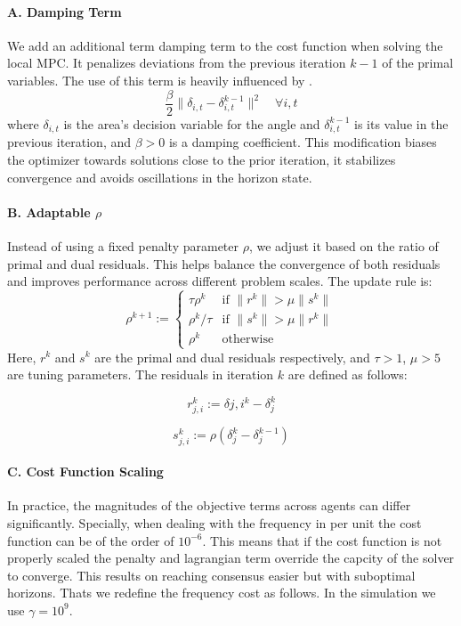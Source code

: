 \documentclass{article}
\begin{document}
\paragraph{A. Damping Term} 
We add an additional term damping term to the cost function when solving the local MPC. It penalizes deviations from the previous iteration $k-1$ of the primal variables. The use of this term is heavily influenced by \cite{ADMM:edu}.
\[
 \frac{\beta}{2} \|\delta_{i,t} - \delta_{i,t}^{k-1}\|^2 \quad \forall i,t
\]
where $\delta_{i,t}$ is the area's decision variable for the angle and  $\delta_{i,t}^{k-1}$ is its value in the previous iteration, and \( \beta > 0 \) is a damping coefficient. This modification biases the optimizer towards solutions close to the prior iteration, it stabilizes convergence and avoids oscillations in the horizon state.

\paragraph{B. Adaptable \(\rho\)} 


Instead of using a fixed penalty parameter \( \rho \), we adjust it based on the ratio of primal and dual residuals. This helps balance the convergence of both residuals and improves performance across different problem scales\cite{ADMM:boyd}. The update rule is:
\[
\rho^{k+1} := 
\begin{cases}
\tau \rho^k & \text{if } \|r^k\| > \mu \|s^k\| \\
\rho^k / \tau & \text{if } \|s^k\| > \mu \|r^k\| \\
\rho^k & \text{otherwise}
\end{cases}
\]
Here, \( r^k \) and \( s^k \) are the primal and dual residuals respectively, and \( \tau > 1 \), \( \mu > 5 \) are tuning parameters. The residuals in iteration $k$ are defined as follows:

\[
r_{j,i}^k := \delta{j,i}^k - \delta_j^k
\]

\[
s_{j,i}^k := \rho \left( \delta_j^k - \delta_j^{k-1} \right)
\]

\paragraph{C. Cost Function Scaling} 
In practice, the magnitudes of the objective terms across agents can differ significantly. Specially, when dealing with the frequency in per unit the cost function can be of the order of $10^{-6}$. This means that if the cost function is not properly scaled the penalty and lagrangian term override the capcity of the solver to converge. This results on reaching consensus easier but with suboptimal horizons. Thats we redefine the frequency cost as follows. In the simulation we use $\gamma = 10^9$.
\end{document}
